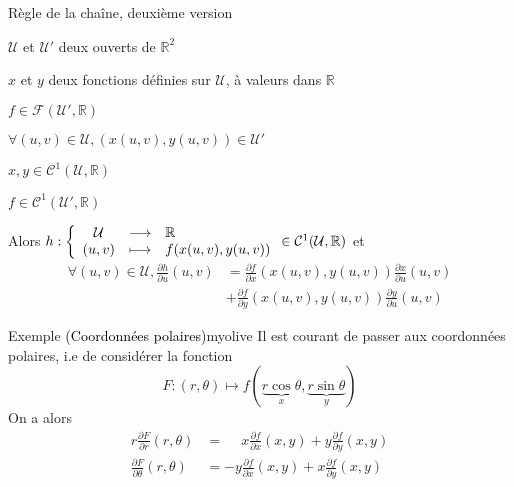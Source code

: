     \begin{prop}{Règle de la chaîne, deuxième version}{}
        \begin{soient}
            \item $\mathcal{U}$ et $\mathcal{U}'$ deux ouverts de $\mathbb{R}^2$
            \item $x$ et $y$ deux fonctions définies sur $\mathcal{U}$, à valeurs dans $\mathbb{R}$
            \item $f \in \mathcal{F}(\mathcal{U}',\mathbb{R})$
        \end{soient}
        \begin{suppose}
            \item $\forall (u,v) \in \mathcal{U}, \left(x(u,v),y(u,v)\right) \in \mathcal{U}'$
            \item $x,y \in \mathcal{C}^1 (\mathcal{U},\mathbb{R})$
            \item $ f \in \mathcal{C}^1 (\mathcal{U}',\mathbb{R})$
        \end{suppose}
        Alors $\fonction{h}{\mathcal{U}}{\mathbb{R}}{(u,v)}{f(x(u,v),y(u,v))} \in \mathcal{C}^1(\mathcal{U},\mathbb{R})$ et 
        \begin{align*}
            \forall (u,v) \in \mathcal{U}, \frac{\partial h}{\partial u}(u,v) &= \frac{\partial f}{\partial x}(x(u,v),y(u,v))\frac{\partial x}{\partial u}(u,v) \\ &+ \frac{\partial f}{\partial y}(x(u,v),y(u,v))\frac{\partial y}{\partial u}(u,v)
        \end{align*}
    \end{prop}

    \begin{omed}{Exemple \textcolor{black}{(Coordonnées polaires)}}{myolive}
        Il est courant de passer aux coordonnées polaires, i.e de considérer la fonction 
        \[F : (r,\theta) \mapsto f(\underbrace{r \cos \theta}_x,\underbrace{ r \sin \theta}_y) \]
        On a alors 
        \begin{align*}
            r \frac{\partial F}{\partial r}(r,\theta) &= \phantom{-}x \frac{\partial f}{\partial x}(x,y) + y \frac{\partial f}{\partial y}(x,y) \\
            \frac{\partial F}{\partial \theta}(r,\theta) &= -y \frac{\partial f}{\partial x}(x,y) + x \frac{\partial f}{\partial y}(x,y) \\
        \end{align*}
    \end{omed}

